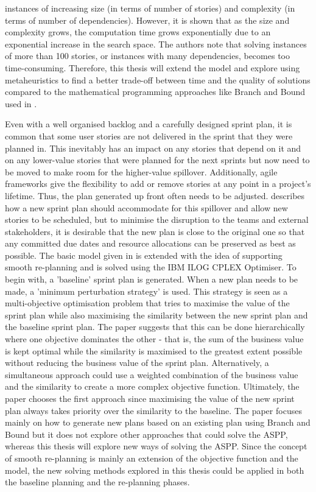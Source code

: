 instances of increasing size (in terms of number of stories) and complexity (in terms of number of dependencies). However, it is shown that as the size and complexity grows, the computation time grows exponentially due to an exponential increase in the search space. The authors note that solving instances of more than 100 stories, or instances with many dependencies, becomes too time-consuming. Therefore, this thesis will extend the model and explore using metaheuristics to find a better trade-off between time and the quality of solutions compared to the mathematical programming approaches like Branch and Bound used in \citet{golfarelli2012sprint}.

Even with a well organised backlog and a carefully designed sprint plan, it is common that some user stories are not delivered in the sprint that they were planned in. This inevitably has an impact on any stories that depend on it and on any lower-value stories that were planned for the next sprints but now need to be moved to make room for the higher-value spillover. Additionally, agile frameworks give the flexibility to add or remove stories at any point in a project's lifetime. Thus, the plan generated up front often needs to be adjusted. \citet{golfarelli2013multi} describes how a new sprint plan should accommodate for this spillover and allow new stories to be scheduled, but to minimise the disruption to the teams and external stakeholders, it is desirable that the new plan is close to the original one so that any committed due dates and resource allocations can be preserved as best as possible. The basic model given in \citet{golfarelli2012sprint} is extended with the idea of supporting smooth re-planning and is solved using the IBM ILOG CPLEX Optimiser. To begin with, a 'baseline' sprint plan is generated. When a new plan needs to be made, a 'minimum perturbation strategy' is used. This strategy is seen as a multi-objective optimisation problem that tries to maximise the value of the sprint plan while also maximising the similarity between the new sprint plan and the baseline sprint plan. The paper suggests that this can be done hierarchically where one objective dominates the other - that is, the sum of the business value is kept optimal while the similarity is maximised to the greatest extent possible without reducing the business value of the sprint plan. Alternatively, a simultaneous approach could use a weighted combination of the business value and the similarity to create a more complex objective function. Ultimately, the paper chooses the first approach since maximising the value of the new sprint plan always takes priority over the similarity to the baseline. The paper focuses mainly on how to generate new plans based on an existing plan using Branch and Bound but it does not explore other approaches that could solve the ASPP, whereas this thesis will explore new ways of solving the ASPP. Since the concept of smooth re-planning is mainly an extension of the objective function and the model, the new solving methods explored in this thesis could be applied in both the baseline planning and the re-planning phases.

